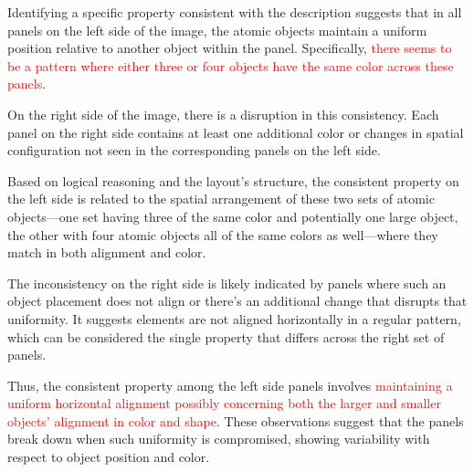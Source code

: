 \begin{tcolorbox}[breakable,enhanced jigsaw,opacityback=0,]
\begin{dialogue}
		Identifying a specific property consistent with the description suggests that in all panels on the left side of the image, the atomic objects maintain a uniform position relative to another object within the panel. Specifically, \textcolor{red}{there seems to be a pattern where either three or four objects have the same color across these panels}.
		
		On the right side of the image, there is a disruption in this consistency. Each panel on the right side contains at least one additional color or changes in spatial configuration not seen in the corresponding panels on the left side.
		
		Based on logical reasoning and the layout's structure, the consistent property on the left side is related to the spatial arrangement of these two sets of atomic objects—one set having three of the same color and potentially one large object, the other with four atomic objects all of the same colors as well—where they match in both alignment and color.
		
		The inconsistency on the right side is likely indicated by panels where such an object placement does not align or there’s an additional change that disrupts that uniformity. It suggests elements are not aligned horizontally in a regular pattern, which can be considered the single property that differs across the right set of panels.
		
		Thus, the consistent property among the left side panels involves \textcolor{red}{maintaining a uniform horizontal alignment possibly concerning both the larger and smaller objects' alignment in color and shape}. These observations suggest that the panels break down when such uniformity is compromised, showing variability with respect to object position and color.
	\end{dialogue}
	\label{fig:task10-bongard}
\end{tcolorbox}




